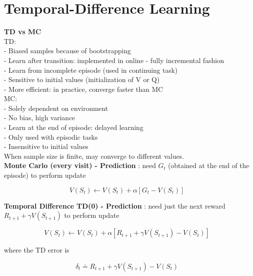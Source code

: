 \documentclass{article}
\begin{document}
\newpage
\noindent
\section{Temporal-Difference Learning}

\noindent
\textbf{TD vs MC}\\

\noindent
TD:\\
- Biased samples because of bootstrapping\\
- Learn after transition: implemented in online - fully incremental fashion\\
- Learn from incomplete episode (used in continuing task)\\
- Sensitive to initial values (initialization of V or Q)\\
- More efficient: in practice, converge faster than MC\\

\noindent
MC:\\
- Solely dependent on environment\\
- No bias, high variance\\
- Learn at the end of episode: delayed learning\\
- Only used with episodic tasks\\
- Insensitive to initial values\\

\noindent
When sample size is finite, may converge to different values.\\

\noindent
\textbf{Monte Carlo (every visit) - Prediction}
: need $G_{t}$ (obtained at the end of the episode) to perform update

\begin{equation}
V\left(S_{t}\right) \leftarrow V\left(S_{t}\right)+\alpha\left[G_{t}-V\left(S_{t}\right)\right]
\end{equation}

\noindent
\textbf{Temporal Difference TD(0) - Prediction}
: need just the next reward $R_{t+1}+\gamma V\left(S_{t+1}\right)$ to perform
update

\begin{equation}
V\left(S_{t}\right) \leftarrow V\left(S_{t}\right)+\alpha\left[R_{t+1}+\gamma V\left(S_{t+1}\right)-V\left(S_{t}\right)\right]
\end{equation}

\noindent
where the TD error is 

\begin{equation}
\delta_{t} \doteq R_{t+1}+\gamma V\left(S_{t+1}\right)-V\left(S_{t}\right)
\end{equation}
\end{document}
